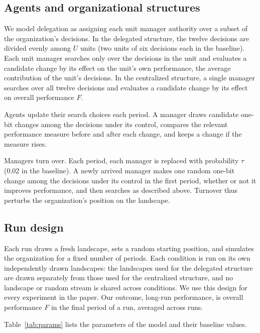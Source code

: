 \documentclass[11pt]{article}
\begin{document}
\subsection{Agents and organizational structures}

We model delegation as assigning each unit manager authority over a subset of the organization's decisions. In the delegated structure, the twelve decisions are divided evenly among $U$ units (two units of six decisions each in the baseline). Each unit manager searches only over the decisions in the unit and evaluates a candidate change by its effect on the unit's own performance, the average contribution of the unit's decisions. In the centralized structure, a single manager searches over all twelve decisions and evaluates a candidate change by its effect on overall performance $F$.

Agents update their search choices each period. A manager draws candidate one-bit changes among the decisions under its control, compares the relevant performance measure before and after each change, and keeps a change if the measure rises.

Managers turn over. Each period, each manager is replaced with probability $\tau$ (0.02 in the baseline). A newly arrived manager makes one random one-bit change among the decisions under its control in the first period, whether or not it improves performance, and then searches as described above. Turnover thus perturbs the organization's position on the landscape.

\subsection{Run design}

Each run draws a fresh landscape, sets a random starting position, and simulates the organization for a fixed number of periods. Each condition is run on its own independently drawn landscapes: the landscapes used for the delegated structure are drawn separately from those used for the centralized structure, and no landscape or random stream is shared across conditions. We use this design for every experiment in the paper. Our outcome, long-run performance, is overall performance $F$ in the final period of a run, averaged across runs.

Table~\ref{tab:params} lists the parameters of the model and their baseline values.
\end{document}
